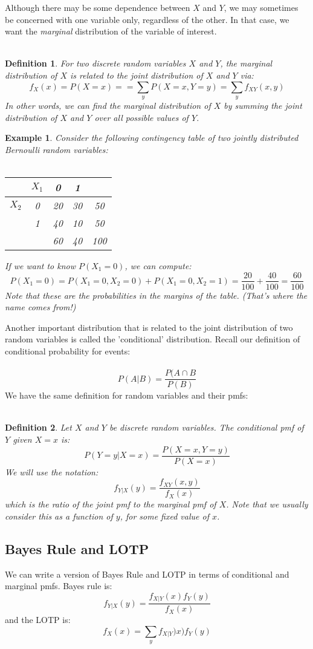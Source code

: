 \documentclass[12pt]{article} %
\newtheorem{defn}{Definition}
\newtheorem{example}{Example}
\begin{document}
Although there may be some dependence between $X$ and $Y$, we may sometimes be concerned with one variable only, regardless of the other. In that case, we want the \emph{marginal} distribution of the variable of interest.\\\\
\begin{defn}
For two discrete random variables $X$ and $Y$, the marginal distribution of $X$ is related to the joint distribution of $X$ and $Y$ via:
$$f_X(x) = P(X=x) = = \sum_y P(X=x,Y=y) = \sum_y f_{XY}(x,y)$$
In other words, we can find the marginal distribution of $X$ by summing the joint distribution of $X$ and $Y$ over all possible values of $Y$.
\end{defn}
\begin{example}
Consider the following contingency table of two jointly distributed Bernoulli random variables:\\\\


\begin{tabular}{lc|c|c|c}
&$X_1$&0&1&\\
\hline
$X_2$&0&20&30&50\\
\hline
&1&40&10&50\\ 
\hline
&&60&40&100\\ 
\end{tabular}

If we want to know $P(X_1=0)$, we can compute:
$$P(X_1=0) = P(X_1=0,X_2=0) + P(X_1=0,X_2=1) = \frac{20}{100} + \frac{40}{100} = \frac{60}{100}$$
Note that these are the probabilities in the \emph{margins} of the table. (That's where the name comes from!)
\end{example}
Another important distribution that is related to the joint distribution of two random variables is called the 'conditional' distribution. Recall our definition of conditional probability for events:\\\\
$$P(A|B) = \frac{P(A\cap B}{P(B)}$$
We have the same definition for random variables and their pmfs:\\\\
\begin{defn}
Let $X$ and $Y$ be discrete random variables. The conditional pmf of $Y$ given $X=x$ is:
$$P(Y=y|X=x) = \frac{P(X=x,Y=y)}{P(X=x)}$$
We will use the notation:
$$f_{Y|X}(y) = \frac{f_{XY}(x,y)}{f_X(x)}$$
which is the ratio of the joint pmf to the marginal pmf of $X$. Note that we usually consider this as a function of $y$, for some fixed value of $x$.
\end{defn}
\subsection{Bayes Rule and LOTP}
We can write a version of Bayes Rule and LOTP in terms of conditional and marginal pmfs. Bayes rule is:
$$f_{Y|X}(y) = \frac{f_{X|Y}(x) f_Y(y)}{f_X(x)}$$
and the LOTP is:
$$f_X(x) = \sum_y f_{X|Y})x) f_Y(y)$$ 
\end{document}
